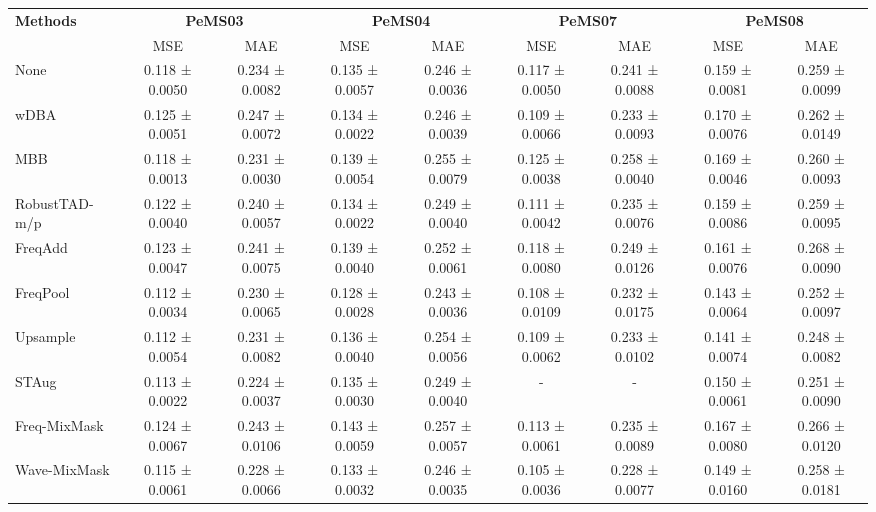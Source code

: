 \begin{table}[h!]
\centering
\vspace{0.2cm}
\renewcommand{\arraystretch}{1.3}
\begin{adjustbox}{max width=\textwidth}
\begin{tabular}{l|cc|cc|cc|cc}
    \toprule
    \textbf{Methods} & \multicolumn{2}{c|}{\textbf{PeMS03}} & \multicolumn{2}{c|}{\textbf{PeMS04}} & \multicolumn{2}{c|}{\textbf{PeMS07}} & \multicolumn{2}{c}{\textbf{PeMS08}} \\
    & MSE & MAE & MSE & MAE & MSE & MAE & MSE & MAE \\
    \midrule
    None         & 0.118 ± 0.0050 & 0.234 ± 0.0082 & 0.135 ± 0.0057 & 0.246 ± 0.0036 & 0.117 ± 0.0050 & 0.241 ± 0.0088 & 0.159 ± 0.0081 & 0.259 ± 0.0099 \\
    wDBA          & 0.125 ± 0.0051 & 0.247 ± 0.0072 & 0.134 ± 0.0022 & 0.246 ± 0.0039 & 0.109 ± 0.0066 & 0.233 ± 0.0093 & 0.170 ± 0.0076 & 0.262 ± 0.0149 \\
    MBB          & 0.118 ± 0.0013 & 0.231 ± 0.0030 & 0.139 ± 0.0054 & 0.255 ± 0.0079 & 0.125 ± 0.0038 & 0.258 ± 0.0040 & 0.169 ± 0.0046 & 0.260 ± 0.0093 \\
    RobustTAD-m/p  & 0.122 ± 0.0040 & 0.240 ± 0.0057 & 0.134 ± 0.0022 & 0.249 ± 0.0040 & 0.111 ± 0.0042 & 0.235 ± 0.0076 & 0.159 ± 0.0086 & 0.259 ± 0.0095 \\
    FreqAdd      & 0.123 ± 0.0047 & 0.241 ± 0.0075 & 0.139 ± 0.0040 & 0.252 ± 0.0061 & 0.118 ± 0.0080 & 0.249 ± 0.0126 & 0.161 ± 0.0076 & 0.268 ± 0.0090 \\
    FreqPool     & \cellcolor{secondcolor}0.112 ± 0.0034 & 0.230 ± 0.0065 & \cellcolor{secondcolor}0.128 ± 0.0028 & \cellcolor{secondcolor}0.243 ± 0.0036 & 0.108 ± 0.0109 & 0.232 ± 0.0175 & 0.143 ± 0.0064 & 0.252 ± 0.0097 \\
    Upsample     & 0.112 ± 0.0054 & 0.231 ± 0.0082 & 0.136 ± 0.0040 & 0.254 ± 0.0056 & 0.109 ± 0.0062 & 0.233 ± 0.0102 & \cellcolor{secondcolor}0.141 ± 0.0074 & \cellcolor{secondcolor}0.248 ± 0.0082 \\
    STAug        & 0.113 ± 0.0022 & \cellcolor{secondcolor}0.224 ± 0.0037 & 0.135 ± 0.0030 & 0.249 ± 0.0040 & - & - & 0.150 ± 0.0061 & 0.251 ± 0.0090 \\
    Freq-MixMask & 0.124 ± 0.0067 & 0.243 ± 0.0106 & 0.143 ± 0.0059 & 0.257 ± 0.0057 & 0.113 ± 0.0061 & 0.235 ± 0.0089 & 0.167 ± 0.0080 & 0.266 ± 0.0120 \\
    Wave-MixMask & 0.115 ± 0.0061 & 0.228 ± 0.0066 & 0.133 ± 0.0032 & 0.246 ± 0.0035 & \cellcolor{secondcolor}0.105 ± 0.0036 & \cellcolor{secondcolor}0.228 ± 0.0077 & 0.149 ± 0.0160 & 0.258 ± 0.0181 \\

\end{tabular}
\end{adjustbox}
\end{table}
